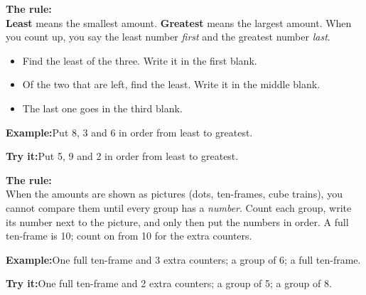 \documentclass[12pt]{article}
\begin{document}

\begin{formulabox}\textbf{The rule:}\\[4pt]
\textbf{Least} means the smallest amount. \textbf{Greatest} means the largest amount.
When you count up, you say the least number \emph{first} and the greatest number \emph{last}.
\begin{itemize}[leftmargin=1.2cm, itemsep=1pt, topsep=2pt]
  \item Find the least of the three. Write it in the first blank.
  \item Of the two that are left, find the least. Write it in the middle blank.
  \item The last one goes in the third blank.
\end{itemize}
\end{formulabox}
\begin{examplebox}\textbf{Example:}\quad Put 8, 3 and 6 in order from least to greatest.
\end{examplebox}
\begin{tryitbox}\textbf{Try it:}\quad Put 5, 9 and 2 in order from least to greatest.\\[2pt]
\end{tryitbox}

\begin{formulabox}\textbf{The rule:}\\[4pt]
When the amounts are shown as pictures (dots, ten-frames, cube trains), you cannot
compare them until every group has a \emph{number}. Count each group, write its number
next to the picture, and only then put the numbers in order.
A full ten-frame is 10; count on from 10 for the extra counters.
\end{formulabox}
\begin{examplebox}\textbf{Example:}\quad One full ten-frame and 3 extra counters; a group of 6; a full ten-frame.
\end{examplebox}
\begin{tryitbox}\textbf{Try it:}\quad One full ten-frame and 2 extra counters; a group of 5; a group of 8.\\[2pt]
\end{tryitbox}
\end{document}
